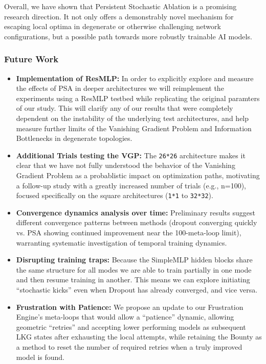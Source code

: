 \documentclass[conference]{IEEEtran}
\begin{document}
Overall, we have shown that Persistent Stochastic Ablation is a promising research direction. It not only offers a demonstrably novel mechanism for escaping local optima in degenerate or otherwise challenging network configurations, but a possible path towards more robustly trainable AI models.

\subsubsection{Future Work}

\begin{itemize}

\item \textbf{Implementation of ResMLP:} In order to explicitly explore and measure the effects of PSA in deeper architectures we will reimplement the experiments using a ResMLP testbed while replicating the original paramters of our study. This will clarify any of our results that were completely dependent on the instability of the underlying test architectures, and help measure further limits of the Vanishing Gradient Problem and Information Bottlenecks in degenerate topologies.

\item \textbf{Additional Trials testing the VGP: } The \verb|26*26| architecture makes it clear that we have not fully understood the behavior of the Vanishing Gradient Problem as a probablistic impact on optimization paths, motivating a follow-up study with a greatly increased number of trials (e.g., n=100), focused specifically on the square architectures (\texttt{1*1} to \texttt{32*32}).

\item \textbf{Convergence dynamics analysis over time:} Preliminary results suggest different convergence patterns between methods (dropout converging quickly vs. PSA showing continued improvement near the 100-meta-loop limit), warranting systematic investigation of temporal training dynamics.

\item \textbf{Disrupting training traps:} Because the SimpleMLP hidden blocks share the same structure for all modes we are able to train partially in one mode and then resume training in another. This means we can explore initiating ``stochastic kicks'' even when Dropout has already converged, and vice versa.

\item \textbf{Frustration with Patience:} We propose an update to our Frustration Engine's meta-loops that would allow a ``patience'' dynamic, allowing geometric ``retries'' and accepting lower performing models as subsequent LKG states after exhausting the local attempts, while retaining the Bounty as a method to reset the number of required retries when a truly improved model is found.


\end{itemize}
\end{document}
